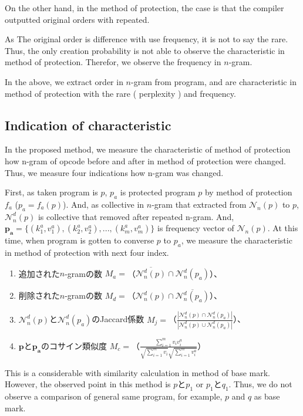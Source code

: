 \documentclass[conference]{IEEEtran}
\newcommand{\distinct}[1]{\mathcal{N}_n^d(#1)}
\begin{document}
On the other hand, in the method of protection, the case is that the compiler outputted original orders with repeated.

As The original order is difference with use frequency, it is not to say the rare.
Thus, the only creation probability is not able to observe the characteristic in method of protection.
Therefor, we observe the frequency in $n$-gram.

In the above, we extract order in $n$-gram from program, and are characteristic in method of protection with the rare ( perplexity ) and frequency.
%

\subsection{Indication of characteristic}
In the proposed method, we measure the characteristic of method of protection how n-gram of opcode before and after in method of protection were changed.
Thus, we measure four indications how n-gram was changed.

First, as taken program is $p$, $p_a$ is protected program $p$ by method of protection $f_a$
($p_a=f_a(p)$).
And, as collective in $n$-gram that extracted from $\mathcal{N}_n(p)$ to $p$, $\distinct{p}$ is collective that removed after repeated n-gram.
And, $\bm{p_a}=\{ (k^a_1, v^a_1), (k^a_2, v^a_2), ..., (k^a_m, v^a_m) \}$ is frequency vector 
of $\mathcal{N}_n(p)$.
At this time, when program is gotten to converse $p$ to $p_a$, we measure the characteristic in method of protection with next four index. 

\begin{enumerate}
\item 追加された$n$-gramの数 $M_a=$（$\overline{\distinct{p}} \cap \distinct{p_a}$）、
\item 削除された$n$-gramの数 $M_d=$（$\distinct{p} \cap \overline{\distinct{p_a}}$）、
\item $\distinct{p}$と$\distinct{p_a}$のJaccard係数 $M_j=$（$\displaystyle
  \frac{|\distinct{p} \cap \distinct{p_a}|}{|\distinct{p} \cup
    \distinct{p_a}|}$）、
\item $\bm{p}$と$\bm{p_a}$のコサイン類似度 $M_c=$（$\displaystyle
  \frac{\sum_{i=1}^{m} v_i v^a_i}{\sqrt{\sum_{i=1}^m v_i}
    \sqrt{\sum_{i=1}^m v^a_i}}$）
\end{enumerate}
%

This is a considerable with similarity calculation in method of base mark.
However, the observed point in this method is $p$と$p_1$ or $p_1$と$q_1$.
Thus, we do not observe a comparison of general same program, 
for example, $p$ and $q$ as base mark.
\end{document}
